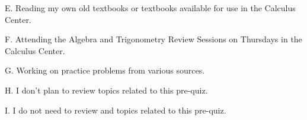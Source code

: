 \documentclass{ximera}
\begin{document}
\begin{question}
\begin{question}
    E. Reading my own old textbooks or textbooks available for use in the Calculus Center.

    \begin{multipleChoice}
    \end{multipleChoice}
    
\end{question}
\begin{question}
    
    F. Attending the Algebra and Trigonometry Review Sessions on Thursdays in the Calculus Center.

    \begin{multipleChoice}
    \end{multipleChoice}
    
\end{question}
\begin{question}
    
    G. Working on practice problems from various sources.

    \begin{multipleChoice}
    \end{multipleChoice}
    
\end{question}
\begin{question}
    
    H. I don't plan to review topics related to this pre-quiz.

    \begin{multipleChoice}
    \end{multipleChoice}
    
\end{question}
\begin{question}
    
    I. I do not need to review and topics related to this pre-quiz.

    \begin{multipleChoice}
    \end{multipleChoice}

\end{question}
\end{question}
\end{document}

